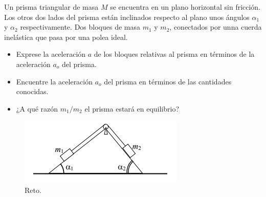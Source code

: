 \begin{mdframed}[style=warning]
	\begin{reto}
		Un prisma triangular de masa $M$ se encuentra en un plano horizontal sin fricción. Los otros dos lados del prisma están inclinados respecto al plano unos ángulos $\alpha _1$ y $\alpha _2$ respectivamente. Dos bloques de masa $m_1$ y $m_2$, conectados por unna cuerda inelástica que pasa por una polea ideal.
	\begin{itemize}
		\item Exprese la aceleración $a$ de los bloques relativas al prisma en términos de la aceleración $a_o$ del prisma.
		\item Encuentre la aceleración $a_o$ del prisma en términos de las cantidades conocidas.
		\item ¿A qué razón $m_1 /m_2$ el prisma estará en equilibrio?
	\end{itemize}
		\begin{figure}[H]
			\centering
			\includegraphics[scale=0.7]{./img/cunamovil.png}
			\caption{Reto.}
		\end{figure}
	\end{reto}
\end{mdframed}


















